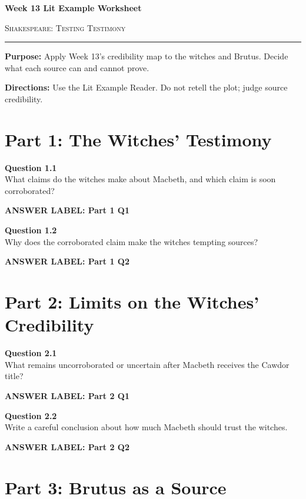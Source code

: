\documentclass[12pt]{article}
\newcommand{\answerbox}[2]{%
\vspace{0.12em}
\noindent\textbf{#1}\par
\vspace{0.04em}
\noindent\fbox{%
\begin{minipage}[t][#2]{\dimexpr\textwidth-2\fboxsep-2\fboxrule}
\rule{\textwidth}{0pt}
\vspace{#2}
\end{minipage}}
\par\vspace{0.22em}}
\begin{document}
\begin{center}
{\LARGE\bfseries Week 13 Lit Example Worksheet}\par\vspace{0.05em}
{\large\scshape Shakespeare: Testing Testimony}\par\vspace{0.12em}
\rule{0.78\textwidth}{0.5pt}
\end{center}

\textbf{Purpose:} Apply Week 13's credibility map to the witches and Brutus. Decide what each source can and cannot prove.

\textbf{Directions:} Use the Lit Example Reader. Do not retell the plot; judge source credibility.

\section*{Part 1: The Witches' Testimony}

\textbf{Question 1.1}\\[-0.15em]
What claims do the witches make about Macbeth, and which claim is soon corroborated?

\answerbox{ANSWER LABEL: Part 1 Q1}{2.0in}

\textbf{Question 1.2}\\[-0.15em]
Why does the corroborated claim make the witches tempting sources?

\answerbox{ANSWER LABEL: Part 1 Q2}{2.05in}

\newpage

\section*{Part 2: Limits on the Witches' Credibility}

\textbf{Question 2.1}\\[-0.15em]
What remains uncorroborated or uncertain after Macbeth receives the Cawdor title?

\answerbox{ANSWER LABEL: Part 2 Q1}{2.2in}

\textbf{Question 2.2}\\[-0.15em]
Write a careful conclusion about how much Macbeth should trust the witches.

\answerbox{ANSWER LABEL: Part 2 Q2}{2.3in}

\newpage

\section*{Part 3: Brutus as a Source}
\end{document}
